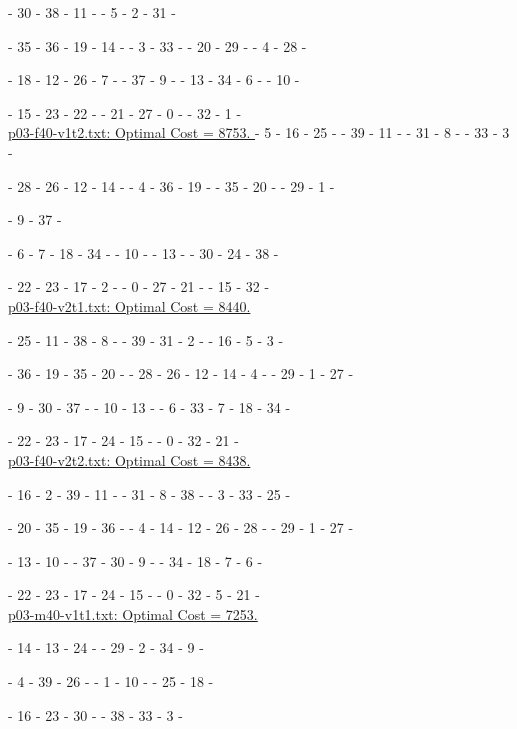 \ta - 30 - 38 - 11 - \ta - 5 - 2 - 31 - \ta 

\tb - 35 - 36 - 19 - 14 - \tb - 3 - 33 - \tb - 20 - 29 - \tb - 4 - 28 - \tb 

\tc - 18 - 12 - 26 - 7 - \tc - 37 - 9 - \tc - 13 - 34 - 6 - \tc - 10 - \tc 

\te - 15 - 23 - 22 - \te - 21 - 27 - 0 - \te - 32 - 1 - \te 
\\ 

\underline{p03-f40-v1t2.txt: Optimal Cost =  8753. }
\ta - 5 - 16 - 25 - \ta - 39 - 11 - \ta - 31 - 8 - \ta - 33 - 3 - \ta 

\tb - 28 - 26 - 12 - 14 - \tb - 4 - 36 - 19 - \tb - 35 - 20 - \tb - 29 - 1 - \tb 

\tc - 9 - 37 - \tc 

\tc - 6 - 7 - 18 - 34 - \tc - 10 - \tc - 13 - \tc - 30 - 24 - 38 - \tc 

\te - 22 - 23 - 17 - 2 - \te - 0 - 27 - 21 - \te - 15 - 32 - \te 
\\ 

\underline{p03-f40-v2t1.txt: Optimal Cost =  8440.} 

\ta - 25 - 11 - 38 - 8 - \ta - 39 - 31 - 2 - \ta - 16 - 5 - 3 - \ta 

\tb - 36 - 19 - 35 - 20 - \tb - 28 - 26 - 12 - 14 - 4 - \tb - 29 - 1 - 27 - \tb

\tc - 9 - 30 - 37 - \tc - 10 - 13 - \tc - 6 - 33 - 7 - 18 - 34 - \tc 

\te- 22 - 23 - 17 - 24 - 15 - \te - 0 - 32 - 21 - \te 
\\ 

\underline{p03-f40-v2t2.txt: Optimal Cost = 8438. }

\ta - 16 - 2 - 39 - 11 - \ta - 31 - 8 - 38 - \ta - 3 - 33 - 25 - \ta 

\tb - 20 - 35 - 19 - 36 - \tb - 4 - 14 - 12 - 26 - 28 - \tb - 29 - 1 - 27 - \tb 

\tc - 13 - 10 - \tc - 37 - 30 - 9 - \tc - 34 - 18 - 7 - 6 - \tc 

\te- 22 - 23 - 17 - 24 - 15 - \te - 0 - 32 - 5 - 21 - \te  
\\ 

\underline{p03-m40-v1t1.txt: Optimal Cost = 7253.}

\ta - 14 - 13 - 24 - \ta - 29 - 2 - 34 - 9 - \ta 

\ta - 4 - 39 - 26 - \ta - 1 - 10 - \ta - 25 - 18 - \ta 

\tc - 16 - 23 - 30 - \tc - 38 - 33 - 3 - \tc 


